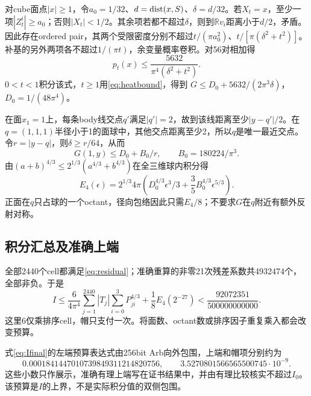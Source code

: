 \documentclass[UTF8,11pt,a4paper,fontset=fandol]{ctexart}
\theoremstyle{remark}\newtheorem{remark}[theorem]{注}
\newcommand{\R}{\mathbb R}\newcommand{\dd}{\,\mathrm d}
\newcommand{\1}{\mathbf1}\newcommand{\pos}[1]{(#1)_+}
\begin{document}
对cube面点$|x|\ge1$，令$a_0=1/32$、$d=\operatorname{dist}(x,S)$、$\delta=d/32$。若$X_t=x$，至少一项$|Z_t^i|\ge a_0$；否则$|X_t|<1/2$。其余项若都不超过$\delta$，则到$\R v_i$距离小于$d/2$，矛盾。因此存在ordered pair，其两个受限密度分别不超过$t/(\pi a_0^2)$、$t/[\pi(\delta^2+t^2)]$。补基的另外两项各不超过$1/(\pi t)$，余变量概率卷积。对56对相加得
\[
 p_t(x)\le\frac{5632}{\pi^4(\delta^2+t^2)}.
\]
$0<t<1$积分该式，$t\ge1$用\eqref{eq:heatbound}，得到
$G\le D_0+5632/(2\pi^3\delta)$，$D_0=1/(48\pi^4)$。

在面$x_1=1$上，每条body线交点$q'$满足$|q'|=2$，故到该线距离至少$|y-q'|/2$。在$q=(1,1,1)$半径小于1的面球中，其他交点距离至少2，所以$q$是唯一最近交点。令$r=|y-q|$，则$\delta\ge r/64$，从而
\begin{equation}\label{eq:capbound}
 G(1,y)\le D_0+B_0/r,\qquad B_0=180224/\pi^3.
\end{equation}
由$(a+b)^{4/3}\le2^{1/3}(a^{4/3}+b^{4/3})$在全三维球内积分得
\begin{equation}\label{eq:cap}
 E_4(\epsilon)=2^{1/3}4\pi\left( D_0^{4/3}\epsilon^3/3+
 \frac35B_0^{4/3}\epsilon^{5/3}\right).
\end{equation}
正面在$q$只占球的一个octant，径向包络因此只需$E_4/8$；不要求$G$在$q$附近有额外反射对称。

\subsection{积分汇总及准确上端}
全部2440个cell都满足\eqref{eq:residual}；准确重算的非零21次残差系数共4932474个，全部非负。于是
\begin{equation}\label{eq:Ifinal}
 I\le\frac6{4\pi^4}\sum_{j=1}^{2440}|T_j|\sum_{i=0}^3P_{ji}^{4/3}
 +\frac18E_4(2^{-27})<\frac{92072351}{500000000000}.
\end{equation}
这里6仅乘排序cell，帽只支付一次。将面数、octant数或排序因子重复乘入都会改变预算。

式\eqref{eq:Ifinal}的左端预算表达式由256bit Arb向外包围，上端和帽项分别约为
\[ 0.0001841447010739849311214820756,\qquad3.5270801566565500745\cdot10^{-9}.\]
这些小数只作展示，准确有理上端写在证书结果中，并由有理比较核实不超过$I_0$。该预算是$I$的上界，不是实际积分值的双侧包围。
\end{document}
